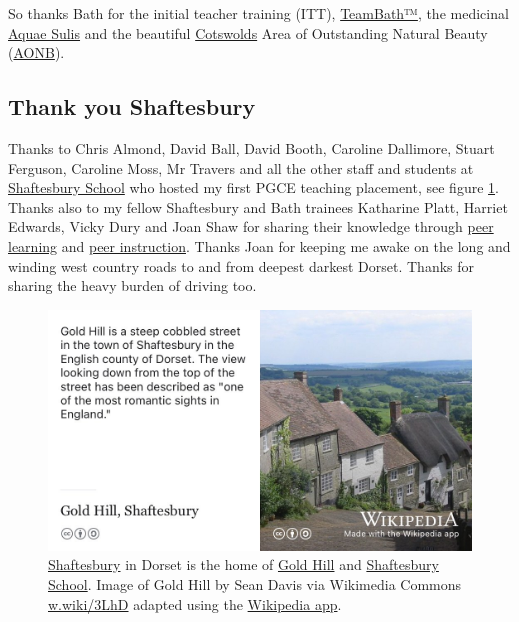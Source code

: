 \documentclass[
]{book}
\begin{document}
So thanks Bath for the initial teacher training (ITT), \href{https://www.teambath.com/}{TeamBath™}, the medicinal \href{https://en.wikipedia.org/wiki/Aquae_Sulis}{Aquae Sulis} and the beautiful \href{https://en.wikipedia.org/wiki/Cotswolds}{Cotswolds} Area of Outstanding Natural Beauty (\href{https://en.wikipedia.org/wiki/Area_of_Outstanding_Natural_Beauty}{AONB}). 🙏

\hypertarget{shaftesbury}{%
\subsection{Thank you Shaftesbury}\label{shaftesbury}}

Thanks to Chris Almond, David Ball, David Booth, Caroline Dallimore, Stuart Ferguson, Caroline Moss, Mr Travers and all the other staff and students at \href{https://en.wikipedia.org/wiki/Shaftesbury_School}{Shaftesbury School} who hosted my first PGCE teaching placement, see figure \ref{fig:shaft-fig}. Thanks also to my fellow Shaftesbury and Bath trainees Katharine Platt, Harriet Edwards, Vicky Dury and Joan Shaw for sharing their knowledge through \href{https://en.wikipedia.org/wiki/Peer_learning}{peer learning} and \href{https://en.wikipedia.org/wiki/Peer_instruction}{peer instruction}. Thanks Joan for keeping me awake on the long and winding west country roads to and from deepest darkest Dorset. Thanks for sharing the heavy burden of driving too.

\begin{figure}

{\centering \includegraphics[width=1\linewidth]{images/shaftesbury} 

}

\caption{\href{https://en.wikipedia.org/wiki/Shaftesbury}{Shaftesbury} in Dorset is the home of \href{https://en.wikipedia.org/wiki/Gold_Hill,_Shaftesbury}{Gold Hill} and \href{https://en.wikipedia.org/wiki/Shaftesbury_School}{Shaftesbury School}. Image of Gold Hill by Sean Davis via Wikimedia Commons \href{https://w.wiki/3LhD}{w.wiki/3LhD} adapted using the \href{https://apps.apple.com/us/app/wikipedia/id324715238}{Wikipedia app}.}\label{fig:shaft-fig}
\end{figure}
\end{document}
